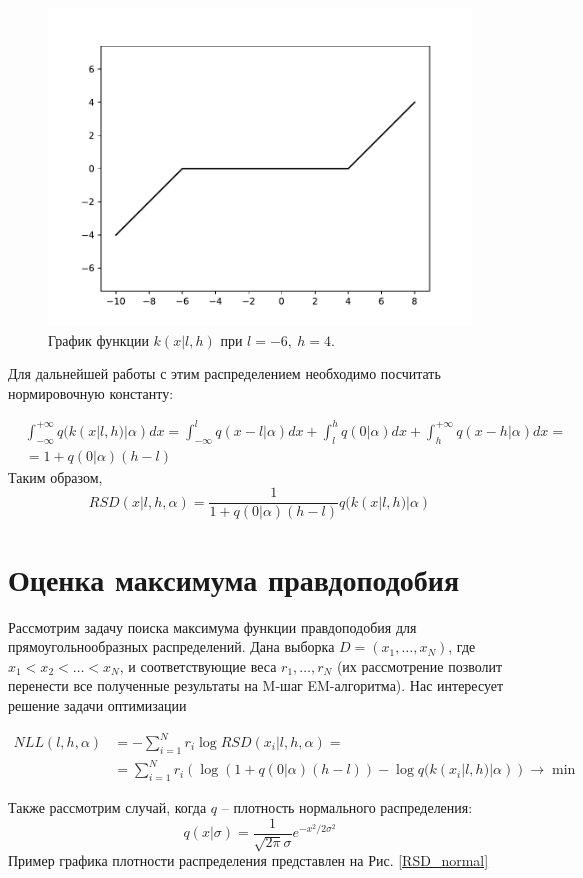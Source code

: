 \documentclass[12pt]{article}
\theoremstyle{definition}
\theoremstyle{plain}
\begin{document}
\begin{figure}
\centering
\includegraphics[width=0.6\linewidth]{k.pdf}
\caption{График функции $k(x | l, h)$ при $l = -6,~h = 4$.}
\label{k}
\end{figure}

Для дальнейшей работы с этим распределением необходимо посчитать нормировочную константу:

\begin{align*}
& \int_{-\infty}^{+\infty} q(k(x | l, h) | \alpha) dx = 
 \int_{-\infty}^{l} q(x - l | \alpha) dx + 
\int_{l}^{h} q(0 | \alpha) dx + 
\int_{h}^{+\infty} q(x - h | \alpha) dx = \\
&= 1 + q(0 | \alpha) (h - l)
\end{align*}
Таким образом,
$$
RSD(x | l, h, \alpha) = \frac{1}{1 + q(0 | \alpha) (h - l)} q(k(x | l, h) | \alpha)
$$

\section{Оценка максимума правдоподобия}

Рассмотрим задачу поиска максимума функции правдоподобия для 
прямоугольнообразных распределений. 
Дана выборка $D = (x_1, \ldots, x_N)$, где $x_1 < x_2 < \ldots < x_N$, 
и соответствующие веса $r_1, \ldots, r_N$ (их рассмотрение позволит 
перенести все полученные результаты на M-шаг EM-алгоритма). Нас интересует решение
задачи оптимизации

\begin{align*}
NLL(l, h, \alpha) &= - \sum_{i = 1}^N r_i \log RSD(x_i | l, h, \alpha) = \\
&= \sum_{i = 1}^N r_i \left(
\log \left( 1 + q(0 | \alpha) (h - l) \right) - \log q(k(x_i | l, h) | \alpha)
\right) \rightarrow \min
\end{align*}

Также рассмотрим случай, когда $q$ -- плотность нормального распределения:
$$
q(x | \sigma) = \frac{1}{\sqrt{2 \pi} \sigma} e^{-x^2 / 2 \sigma^2}
$$
Пример графика плотности распределения представлен на Рис. \ref{RSD_normal}
\end{document}
